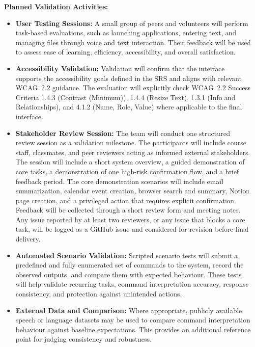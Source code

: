 \documentclass[12pt, titlepage]{article}
\begin{document}
\vspace{0.5em}
\noindent\textbf{Planned Validation Activities:}
\begin{itemize}
\item \textbf{User Testing Sessions:}
  A small group of peers and volunteers will perform task-based
  evaluations, such as launching applications, entering text, and
  managing files through voice and text interaction. Their feedback will
  be used to assess ease of learning, efficiency, accessibility, and
  overall satisfaction.

\item \textbf{Accessibility Validation:}
  Validation will confirm that the interface supports the accessibility
  goals defined in the SRS and aligns with relevant WCAG~2.2 guidance.
  The evaluation will explicitly check WCAG~2.2 Success Criteria 1.4.3
  (Contrast (Minimum)), 1.4.4 (Resize Text), 1.3.1 (Info and
  Relationships), and 4.1.2 (Name, Role, Value) where applicable to the
  final interface.

\item \textbf{Stakeholder Review Session:}
  The team will conduct one structured review session as a validation
  milestone. The participants will include course staff, classmates, and
  peer reviewers acting as informed external stakeholders. The session
  will include a short system overview, a guided demonstration of core
  tasks, a demonstration of one high-risk confirmation flow, and a brief
  feedback period. The core demonstration scenarios will include email
  summarization, calendar event creation, browser search and summary,
  Notion page creation, and a privileged action that requires explicit
  confirmation. Feedback will be collected through a short review form
  and meeting notes. Any issue reported by at least two reviewers, or
  any issue that blocks a core task, will be logged as a GitHub issue
  and considered for revision before final delivery.

\item \textbf{Automated Scenario Validation:}
  Scripted scenario tests will submit a predefined and fully enumerated
  set of commands to the system, record the observed outputs, and compare
  them with expected behaviour. These tests will help validate recurring
  tasks, command interpretation accuracy, response consistency, and
  protection against unintended actions.

\item \textbf{External Data and Comparison:}
  Where appropriate, publicly available speech or language datasets may
  be used to compare command interpretation behaviour against baseline
  expectations. This provides an additional reference point for judging
  consistency and robustness.
\end{itemize}
\end{document}

